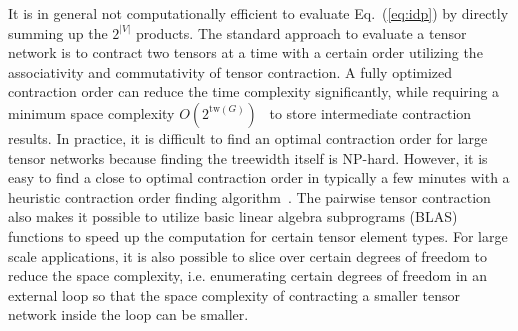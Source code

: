 \documentclass[onefignum, onetabnum]{siamart190516}
\newcommand{\<}{\langle}
\renewcommand{\>}{\rangle}
\newcommand{\Eq}[1]{Eq.~(\ref{#1})}
\newcommand{\blue}[1]{[{\bf  \color{blue}{JG: #1}}]}
\newcommand{\purple}[1]{[{\bf  \color{purple}{MC: #1}}]}
\begin{document}
It is in general not computationally efficient to evaluate \Eq{eq:idp} by directly summing up the $2^{|V|}$ products. %
The standard approach to evaluate a tensor network is to contract two tensors at a time with a certain order utilizing the associativity and commutativity of tensor contraction.
A fully optimized contraction order can reduce the time complexity significantly, while requiring a minimum space complexity $O(2^{\text{tw}(G)})$~\cite{Markov2008} to store intermediate contraction results.
In practice, it is difficult to find an optimal contraction order for large tensor networks because finding the treewidth itself is NP-hard.
However, it is easy to find a close to optimal contraction order in typically a few minutes with a heuristic contraction order finding algorithm~\cite{Kourtis2019,Kalachev2021}. The pairwise tensor contraction also makes it possible to utilize basic linear algebra subprograms (BLAS) functions to speed up the computation for certain tensor element types.
For large scale applications,
it is also possible to slice over certain degrees of freedom to reduce the space complexity, i.e.
enumerating certain degrees of freedom in an external loop so that the space complexity of contracting a smaller tensor network inside the loop can be smaller.
\end{document}
